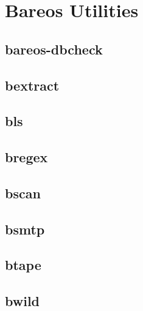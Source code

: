 \chapter{Bareos Utilities}
    \label{_UtilityChapter}


\section{bareos-dbcheck}
    \label{bareos-dbcheck}
    \label{dbcheck}

\section{bextract}
    \label{bextract}

\section{bls}
    \label{bls}

\section{bregex}
    \label{bregex}

\section{bscan}
    \label{bscan}

\section{bsmtp}
    \label{bsmtp}

\section{btape}
    \label{btape}

\section{bwild}
    \label{bwild}
